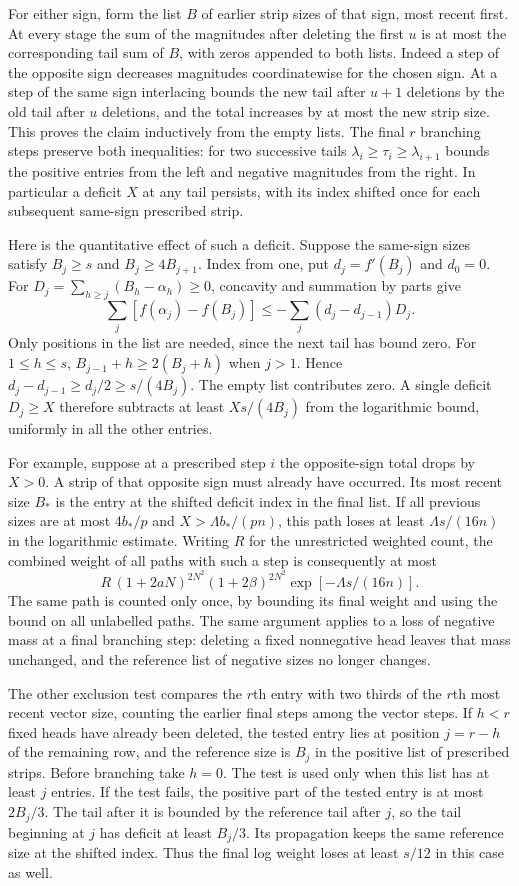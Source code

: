 \documentclass[11pt]{amsart}
\theoremstyle{definition}
\theoremstyle{remark}
\begin{document}
For either sign, form the list $B$ of earlier strip sizes of that
sign, most recent first. At every stage the sum of the magnitudes
after deleting the first $u$ is at most the corresponding tail sum
of $B$, with zeros appended to both lists. Indeed a step of the
opposite sign decreases magnitudes coordinatewise for the chosen
sign. At a step of the same sign interlacing bounds the new tail
after $u+1$ deletions by the old tail after $u$ deletions, and the
total increases by at most the new strip size. This proves the
claim inductively from the empty lists. The final $r$ branching
steps preserve both inequalities: for two successive tails
$\lambda_i\ge\tau_i\ge\lambda_{i+1}$ bounds the positive
entries from the left and negative magnitudes from the right.
In particular a deficit $X$ at any tail persists, with its
index shifted once for each subsequent same-sign prescribed strip.

Here is the quantitative effect of such a deficit. Suppose the
same-sign sizes satisfy $B_j\ge s$ and $B_j\ge4B_{j+1}$.
Index from one, put $d_j=f'(B_j)$ and $d_0=0$. For
$D_j=\sum_{h\ge j}(B_h-\alpha_h)\ge0$, concavity and summation
by parts give
\[
 \sum_j[f(\alpha_j)-f(B_j)]\le
 -\sum_j(d_j-d_{j-1})D_j.
\]
Only positions in the list are needed, since the next tail has
bound zero. For $1\le h\le s$, $B_{j-1}+h\ge2(B_j+h)$
when $j>1$. Hence $d_j-d_{j-1}\ge d_j/2\ge s/(4B_j)$.
The empty list contributes zero. A single deficit $D_j\ge X$
therefore subtracts at least $Xs/(4B_j)$ from the logarithmic
bound, uniformly in all the other entries.

For example, suppose at a prescribed step $i$ the opposite-sign
total drops by $X>0$. A strip of that opposite sign must already
have occurred. Its most recent size $B_*$ is the entry at the
shifted deficit index in the final list. If all previous sizes
are at most $4b_*/p$ and $X>\Lambda b_*/(pn)$, this path loses
at least $\Lambda s/(16n)$ in the logarithmic estimate. Writing
$R$ for the unrestricted weighted count, the combined weight of
all paths with such a step is consequently at most
\[
 R\,(1+2aN)^{2N^2}(1+2\beta)^{2N^2}
          \exp[-\Lambda s/(16n)] .
\]
The same path is counted only once, by bounding its final weight
and using the bound on all unlabelled paths. The same argument
applies to a loss of negative mass at a final branching step:
deleting a fixed nonnegative head leaves that mass unchanged,
and the reference list of negative sizes no longer changes.

The other exclusion test compares the $r$th entry with two thirds
of the $r$th most recent vector size, counting the earlier final
steps among the vector steps. If $h<r$ fixed heads have already
been deleted, the tested entry lies at position $j=r-h$ of the
remaining row, and the reference size is $B_j$ in the positive
list of prescribed strips. Before branching take $h=0$. The
test is used only when this list has at least $j$ entries.
If the test fails, the positive part of the tested entry is at
most $2B_j/3$. The tail after it is bounded by the reference
tail after $j$, so the tail beginning at $j$ has deficit at
least $B_j/3$. Its propagation keeps the same reference size
at the shifted index. Thus the final log weight loses at least
$s/12$ in this case as well.
\end{document}
